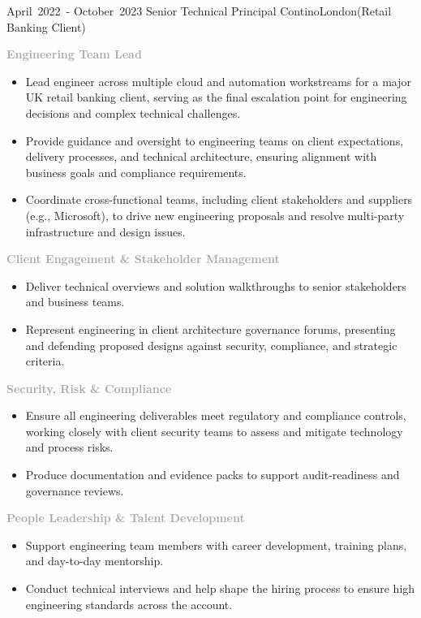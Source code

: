 \cventry %
  {\mbox{April 2022 -} \mbox{October 2023}}
  {Senior Technical Principal}
  {Contino}{London}{(Retail Banking Client)}
  {
    \textcolor{darkgray}{\textbf{Engineering Team Lead}}
    \begin{itemize}
     \item Lead engineer across multiple cloud and automation workstreams for a major UK retail banking client, serving as the final escalation point for engineering decisions and complex technical challenges.
     \item Provide guidance and oversight to engineering teams on client expectations, delivery processes, and technical architecture, ensuring alignment with business goals and compliance requirements.
     \item Coordinate cross-functional teams, including client stakeholders and suppliers (e.g., Microsoft), to drive new engineering proposals and resolve multi-party infrastructure and design issues.
    \end{itemize}
    \textcolor{darkgray}{\textbf{Client Engagement \& Stakeholder Management}}
    \begin{itemize}
     \item Deliver technical overviews and solution walkthroughs to senior stakeholders and business teams.
     \item Represent engineering in client architecture governance forums, presenting and defending proposed designs against security, compliance, and strategic criteria.
    \end{itemize}
    \textcolor{darkgray}{\textbf{Security, Risk \& Compliance}}
    \begin{itemize}
     \item Ensure all engineering deliverables meet regulatory and compliance controls, working closely with client security teams to assess and mitigate technology and process risks.
     \item Produce documentation and evidence packs to support audit-readiness and governance reviews.
    \end{itemize}
    \textcolor{darkgray}{\textbf{People Leadership \& Talent Development}}
    \begin{itemize}
     \item Support engineering team members with career development, training plans, and day-to-day mentorship.
     \item Conduct technical interviews and help shape the hiring process to ensure high engineering standards across the account.
    \end{itemize}
    \bigskip
  }

